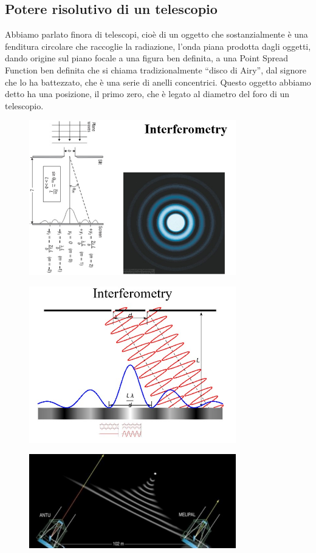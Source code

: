 \documentclass[a4paper,11pt]{article}
\begin{document}
\subsection{Potere risolutivo di un telescopio}
Abbiamo parlato finora di telescopi, cioè di un oggetto che sostanzialmente è una fenditura circolare che raccoglie la radiazione, l’onda piana prodotta dagli oggetti, dando origine sul piano focale a una figura ben definita, a una Point Spread Function ben definita che si chiama tradizionalmente “disco di Airy”, dal signore che lo ha battezzato, che è una serie di anelli concentrici. Questo oggetto abbiamo detto ha una posizione, il primo zero, che è legato al diametro del foro di un telescopio.
\begin{figure}[h!!]
        \centering
        \includegraphics[width=9cm]{27.jpg}
        \label{}
    \end{figure}

\begin{figure}[h!!]
        \centering
        \includegraphics[width=9cm]{28.jpg}
        \label{}
    \end{figure}

\begin{figure}[h!!]
        \centering
        \includegraphics[width=9cm]{29.jpg}
        \label{}
    \end{figure}
\end{document}
